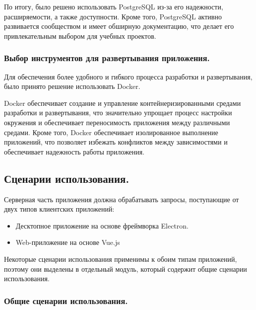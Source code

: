 \documentclass[12pt, russian]{extarticle}
\begin{document}
\begin{spacing}{1.5}
    По итогу, было решено использовать PostgreSQL из-за его надежности, расширяемости, а также доступности.
    Кроме того, PostgreSQL активно развивается сообществом и имеет обширную документацию,
    что делает его привлекательным выбором для учебных проектов.

    \subsubsection{Выбор инструментов для развертывания приложения.}

    Для обеспечения более удобного и гибкого процесса разработки и развертывания,
    было принято решение использовать Docker.

    Docker обеспечивает создание и управление контейнеризированными средами разработки и развертывания,
    что значительно упрощает процесс настройки окружения и обеспечивает переносимость приложения между
    различными средами. Кроме того, Docker обеспечивает изолированное выполнение приложений,
    что позволяет избежать конфликтов между зависимостями и обеспечивает надежность работы приложения.

    \newpage
    \subsection{Сценарии использования.}

    Серверная часть приложения должна обрабатывать запросы, поступающие от двух типов клиентских приложений:

    \begin{itemize}
        \item Десктопное приложение на основе фреймворка Electron.
        \item Web-приложение на основе Vue.js
    \end{itemize}

    Некоторые сценарии использования применимы к обоим типам приложений, поэтому они выделены в отдельный
    модуль, который содержит общие сценарии использования.

    \subsubsection{Общие сценарии использования.}


\end{spacing}
\end{document}
